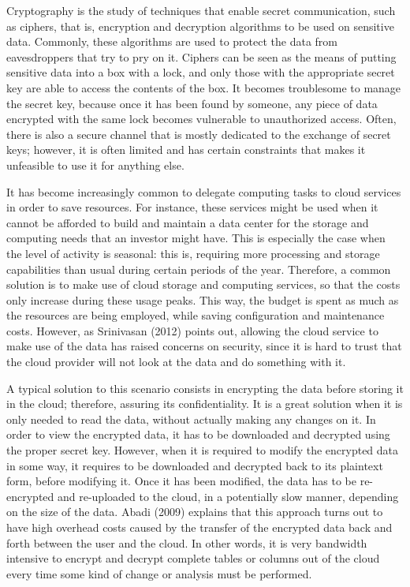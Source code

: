 Cryptography is the study of techniques that enable secret communication, such as ciphers, that is, encryption and decryption algorithms to be used on sensitive data. Commonly, these algorithms are used to protect the data from eavesdroppers that try to pry on it. Ciphers can be seen as the means of putting sensitive data into a box with a lock, and only those with the appropriate secret key are able to access the contents of the box. It becomes troublesome to manage the secret key, because once it has been found by someone, any piece of data encrypted with the same lock becomes vulnerable to unauthorized access. Often, there is also a secure channel that is mostly dedicated to the exchange of secret keys; however, it is often limited and has certain constraints that makes it unfeasible to use it for anything else.

It has become increasingly common to delegate computing tasks to cloud services in order to save resources. For instance, these services might be used when it cannot be afforded to build and maintain a data center for the storage and computing needs that an investor might have. This is especially the case when the level of activity is seasonal: this is, requiring more processing and storage capabilities than usual during certain periods of the year. Therefore, a common solution is to make use of cloud storage and computing services, so that the costs only increase during these usage peaks. This way, the budget is spent as much as the resources are being employed, while saving configuration and maintenance costs. However, as Srinivasan (2012) \cite{Srinivasan:2012:SCC:2345396.2345474} points out, allowing the cloud service to make use of the data has raised concerns on security, since it is hard to trust that the cloud provider will not look at the data and do something with it.

A typical solution to this scenario consists in encrypting the data before storing it in the cloud; therefore, assuring its confidentiality. It is a great solution when it is only needed to read the data, without actually making any changes on it. In order to view the encrypted data, it has to be downloaded and decrypted using the proper secret key. However, when it is required to modify the encrypted data in some way, it requires to be downloaded and decrypted back to its plaintext form, before modifying it. Once it has been modified, the data has to be re-encrypted and re-uploaded to the cloud, in a potentially slow manner, depending on the size of the data. Abadi (2009) \cite{abadi2009data} explains that this approach turns out to have high overhead costs caused by the transfer of the encrypted data back and forth between the user and the cloud. In other words, it is very bandwidth intensive to encrypt and decrypt complete tables or columns out of the cloud every time some kind of change or analysis must be performed.

